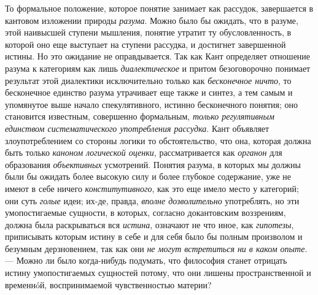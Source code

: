 \documentclass[twoside]{article}
\begin{document}
{{То формальное положение, которое понятие занимает как
рассудок, завершается в кантовом изложении природы
{\em разума}. Можно было
бы ожидать, что в разуме, этой наивысшей ступени мышления, понятие утратит
ту обусловленность, в которой оно еще выступает на ступени рассудка, и
достигнет завершенной истины. Но это ожидание не оправдывается. Так как
Кант определяет отношение разума к категориям как лишь
{\em диалектическое} и
притом безоговорочно понимает результат этой диалектики исключительно
только как {\em бесконечное ничто},
то бесконечное единство разума утрачивает еще
также и синтез, а тем самым и упомянутое выше начало
спекулятивного, истинно бесконечного понятия; оно становится известным,
совершенно формальным, {\em только
регулятивным единством систематического употребления рассудка}.
Кант объявляет злоупотреблением со стороны логики то
обстоятельство, что она, которая должна быть только
{\em каноном логической оценки},
рассматривается как
{\em органон} для
образования {\em объективных}
усмотрений. Понятия разума, в которых мы должны были бы
ожидать более высокую силу и более глубокое содержание, уже не имеют в себе
ничего {\em конститутивного},
как это еще имело место у категорий; они суть
{\em голые} идеи; их-де,
правда, {\em вполне дозволительно}
употреблять, но эти умопостигаемые сущности, в которых,
согласно докантовским воззрениям, должна была раскрываться вся
{\em истина}, означают не
что иное, как {\em гипотезы},
приписывать которым истину в себе и для себя было бы полным
произволом и безумным дерзновением, так как они
{\em не могут встретиться ни в каком
опыте}. — Можно ли было когда-нибудь подумать, что философия
станет отрицать истину умопостигаемых сущностей потому, что они лишены
пространственной и временнóй, воспринимаемой чувственностью материи?

}}
\end{document}
